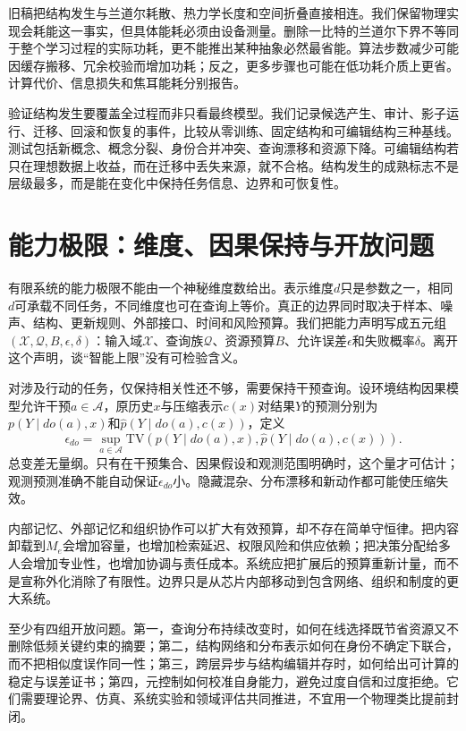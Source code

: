 旧稿把结构发生与兰道尔耗散、热力学长度和空间折叠直接相连。我们保留物理实现会耗能这一事实，但具体能耗必须由设备测量。删除一比特的兰道尔下界不等同于整个学习过程的实际功耗，更不能推出某种抽象必然最省能。算法步数减少可能因缓存搬移、冗余校验而增加功耗；反之，更多步骤也可能在低功耗介质上更省。计算代价、信息损失和焦耳能耗分别报告。

验证结构发生要覆盖全过程而非只看最终模型。我们记录候选产生、审计、影子运行、迁移、回滚和恢复的事件，比较从零训练、固定结构和可编辑结构三种基线。测试包括新概念、概念分裂、身份合并冲突、查询漂移和资源下降。可编辑结构若只在理想数据上收益，而在迁移中丢失来源，就不合格。结构发生的成熟标志不是层级最多，而是能在变化中保持任务信息、边界和可恢复性。

\section{能力极限：维度、因果保持与开放问题}

有限系统的能力极限不能由一个神秘维度数给出。表示维度$d$只是参数之一，相同$d$可承载不同任务，不同维度也可在查询上等价。真正的边界同时取决于样本、噪声、结构、更新规则、外部接口、时间和风险预算。我们把能力声明写成五元组$(\mathcal X,\mathcal Q,B,\epsilon,\delta)$：输入域$\mathcal X$、查询族$\mathcal Q$、资源预算$B$、允许误差$\epsilon$和失败概率$\delta$。离开这个声明，谈“智能上限”没有可检验含义。

对涉及行动的任务，仅保持相关性还不够，需要保持干预查询。设环境结构因果模型允许干预$a\in\mathcal A$，原历史$x$与压缩表示$c(x)$对结果$Y$的预测分别为$p(Y\mid do(a),x)$和$\hat p(Y\mid do(a),c(x))$，定义
\begin{equation}
 \epsilon_{do}=\sup_{a\in\mathcal A}\mathrm{TV}\!\left(p(Y\mid do(a),x),\hat p(Y\mid do(a),c(x))\right).
\end{equation}
总变差无量纲。只有在干预集合、因果假设和观测范围明确时，这个量才可估计；观测预测准确不能自动保证$\epsilon_{do}$小。隐藏混杂、分布漂移和新动作都可能使压缩失效。

内部记忆、外部记忆和组织协作可以扩大有效预算，却不存在简单守恒律。把内容卸载到$M_e$会增加容量，也增加检索延迟、权限风险和供应依赖；把决策分配给多人会增加专业性，也增加协调与责任成本。系统应把扩展后的预算重新计量，而不是宣称外化消除了有限性。边界只是从芯片内部移动到包含网络、组织和制度的更大系统。

至少有四组开放问题。第一，查询分布持续改变时，如何在线选择既节省资源又不删除低频关键约束的摘要；第二，结构网络和分布表示如何在身份不确定下联合，而不把相似度误作同一性；第三，跨层异步与结构编辑并存时，如何给出可计算的稳定与误差证书；第四，元控制如何校准自身能力，避免过度自信和过度拒绝。它们需要理论界、仿真、系统实验和领域评估共同推进，不宜用一个物理类比提前封闭。

